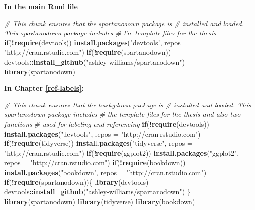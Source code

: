 \documentclass[ms]{uncgdissertationexp}
\newenvironment{Shaded}{\begin{snugshade}}{\end{snugshade}}
\newcommand{\KeywordTok}[1]{\textcolor[rgb]{0.13,0.29,0.53}{\textbf{#1}}}
\newcommand{\DataTypeTok}[1]{\textcolor[rgb]{0.13,0.29,0.53}{#1}}
\newcommand{\StringTok}[1]{\textcolor[rgb]{0.31,0.60,0.02}{#1}}
\newcommand{\CommentTok}[1]{\textcolor[rgb]{0.56,0.35,0.01}{\textit{#1}}}
\newcommand{\ControlFlowTok}[1]{\textcolor[rgb]{0.13,0.29,0.53}{\textbf{#1}}}
\newcommand{\OperatorTok}[1]{\textcolor[rgb]{0.81,0.36,0.00}{\textbf{#1}}}
\newcommand{\NormalTok}[1]{#1}
\theoremstyle{plain}
\theoremstyle{definition}
\theoremstyle{remark}
\begin{document}
  \textbf{In the main Rmd file}
  \begin{Shaded}
  \begin{Highlighting}[]
  \CommentTok{# This chunk ensures that the spartanodown package is}
  \CommentTok{# installed and loaded. This spartanodown package includes}
  \CommentTok{# the template files for the thesis.}
  \ControlFlowTok{if}\NormalTok{(}\OperatorTok{!}\KeywordTok{require}\NormalTok{(devtools))}
    \KeywordTok{install.packages}\NormalTok{(}\StringTok{"devtools"}\NormalTok{, }\DataTypeTok{repos =} \StringTok{"http://cran.rstudio.com"}\NormalTok{)}
  \ControlFlowTok{if}\NormalTok{(}\OperatorTok{!}\KeywordTok{require}\NormalTok{(spartanodown))}
  \NormalTok{  devtools}\OperatorTok{::}\KeywordTok{install_github}\NormalTok{(}\StringTok{"ashley-williams/spartanodown"}\NormalTok{)}
  \KeywordTok{library}\NormalTok{(spartanodown)}
  \end{Highlighting}
  \end{Shaded}
  \textbf{In Chapter \ref{ref-labels}:}
  \begin{Shaded}
  \begin{Highlighting}[]
  \CommentTok{# This chunk ensures that the huskydown package is}
  \CommentTok{# installed and loaded. This spartanodown package includes}
  \CommentTok{# the template files for the thesis and also two functions}
  \CommentTok{# used for labeling and referencing}
  \ControlFlowTok{if}\NormalTok{(}\OperatorTok{!}\KeywordTok{require}\NormalTok{(devtools))}
    \KeywordTok{install.packages}\NormalTok{(}\StringTok{"devtools"}\NormalTok{, }\DataTypeTok{repos =} \StringTok{"http://cran.rstudio.com"}\NormalTok{)}
  \ControlFlowTok{if}\NormalTok{(}\OperatorTok{!}\KeywordTok{require}\NormalTok{(tidyverse))}
      \KeywordTok{install.packages}\NormalTok{(}\StringTok{"tidyverse"}\NormalTok{, }\DataTypeTok{repos =} \StringTok{"http://cran.rstudio.com"}\NormalTok{)}
  \ControlFlowTok{if}\NormalTok{(}\OperatorTok{!}\KeywordTok{require}\NormalTok{(ggplot2))}
      \KeywordTok{install.packages}\NormalTok{(}\StringTok{"ggplot2"}\NormalTok{, }\DataTypeTok{repos =} \StringTok{"http://cran.rstudio.com"}\NormalTok{)}
  \ControlFlowTok{if}\NormalTok{(}\OperatorTok{!}\KeywordTok{require}\NormalTok{(bookdown))}
      \KeywordTok{install.packages}\NormalTok{(}\StringTok{"bookdown"}\NormalTok{, }\DataTypeTok{repos =} \StringTok{"http://cran.rstudio.com"}\NormalTok{)}
  \ControlFlowTok{if}\NormalTok{(}\OperatorTok{!}\KeywordTok{require}\NormalTok{(spartanodown))\{}
    \KeywordTok{library}\NormalTok{(devtools)}
  \NormalTok{  devtools}\OperatorTok{::}\KeywordTok{install_github}\NormalTok{(}\StringTok{"ashley-williams/spartanodown"}\NormalTok{)}
  \NormalTok{  \}}
  \KeywordTok{library}\NormalTok{(spartanodown)}
  \KeywordTok{library}\NormalTok{(tidyverse)}
  \KeywordTok{library}\NormalTok{(bookdown)}
  \end{Highlighting}
  \end{Shaded}
\end{document}
